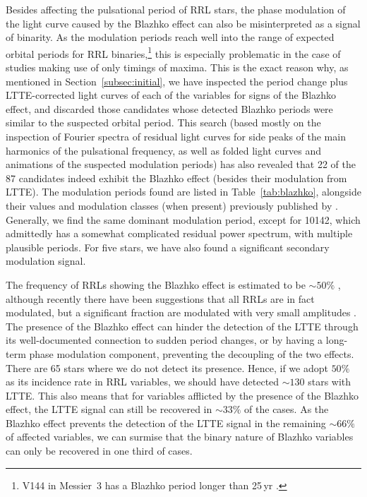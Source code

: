 \documentclass[twocolumn,times]{aastex63}
\begin{document}
Besides affecting the pulsational period of RRL stars, the phase modulation of the light curve caused by the Blazhko effect can also be
misinterpreted as a signal of binarity.
As the modulation periods reach well into the range of expected orbital periods for RRL
binaries,\footnote{V144 in Messier~3 has a Blazhko period longer than 25\,yr \citep{2016CoKon.105..167J}.}
this is especially problematic in the case of studies making use of only timings of maxima.
This is the exact reason why, as mentioned in Section~\ref{subsec:initial}, we have inspected the period change plus LTTE-corrected
light curves of each of the variables for signs of the Blazhko effect, and discarded those candidates whose detected Blazhko periods
were similar to the suspected orbital period.
This search (based mostly on the inspection of Fourier spectra of residual light curves for side peaks of the main harmonics of the
pulsational frequency, as well as folded light curves and animations of the suspected modulation periods)
has also revealed that 22 of the 87 candidates indeed exhibit the Blazhko effect (besides their modulation from LTTE).
The modulation periods found are listed in Table~\ref{tab:blazhko}, alongside their values and modulation classes (when present)
previously published by \citet{2020MNRAS.494.1237S}. Generally, we find the same dominant modulation period, except for 10142,
which admittedly has a somewhat complicated residual power spectrum, with multiple plausible periods.
For five stars, we have also found a significant secondary modulation signal.

The frequency of RRLs showing the Blazhko effect is estimated to be $\sim50\%$ \citep{2009MNRAS.400.1006J, 2010ApJ...713L.198K,2019ApJS..244...32P},
although recently there have been suggestions that all RRLs are in fact modulated, but a significant fraction are modulated with very small amplitudes \citep{2018A&A...614L...4K}.
The presence of the Blazhko effect can hinder the detection of the LTTE through its well-documented connection to
sudden period changes, or by having a long-term phase modulation component, preventing the decoupling of the two effects. 
There are 65 stars where we do not detect its presence. Hence, if we adopt $50\%$ as its incidence rate in RRL variables, we should have
detected $\sim130$ stars with LTTE. This also means that for variables afflicted by the presence of the Blazhko effect, the
LTTE signal can still be recovered in $\sim 33\%$ of the cases. As the Blazhko effect prevents the detection of the LTTE signal in the
remaining $\sim66\%$ of affected variables, we can surmise that the binary nature of Blazhko variables can only be recovered in one third of cases.
\end{document}

